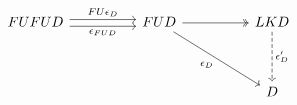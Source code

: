 \[\begin{tikzcd}
	FUFUD && FUD && LKD \\
	\\
	&&&& D
	\arrow["{FU\epsilon_{D}}", shift left, from=1-1, to=1-3]
	\arrow["{\epsilon_{FUD}}"', shift right, from=1-1, to=1-3]
	\arrow[two heads, from=1-3, to=1-5]
	\arrow["{\epsilon_{D}}"', from=1-3, to=3-5]
	\arrow["{\epsilon'_{D}}", dashed, from=1-5, to=3-5]
\end{tikzcd}\]